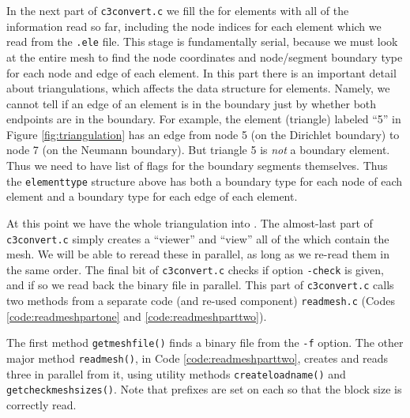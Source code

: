 
In the next part of \texttt{c3convert.c} we fill the \pVec for elements with all of the information read so far, including the node indices for each element which we read from the \texttt{.ele} file.  This stage is fundamentally serial, because we must look at the entire mesh to find the node coordinates and node/segment boundary type for each node and edge of each element.  In this part there is an important detail about triangulations, which affects the data structure for elements.  Namely, we cannot tell if an edge of an element is in the boundary just by whether both endpoints are in the boundary.  For example, the element (triangle) labeled ``5'' in Figure \ref{fig:triangulation} has an edge from node 5 (on the Dirichlet boundary) to node 7 (on the Neumann boundary).  But triangle 5 is \emph{not} a boundary element.  Thus we need to have list of flags for the boundary segments themselves.  Thus the \texttt{elementtype} structure above has both a boundary type for each node of each element and a boundary type for each edge of each element.

At this point we have the whole triangulation into \PETSc \pVecs.  The almost-last part of \texttt{c3convert.c} simply creates a \PETSc ``viewer'' and ``view'' all of the \pVecs which contain the mesh.  We will be able to reread these \pVecs in parallel, as long as we re-read them in the same order.  The final bit of \texttt{c3convert.c} checks if option \texttt{-check} is given, and if so we read back the binary file in parallel.  This part of \texttt{c3convert.c} calls two methods from a separate code (and re-used component) \texttt{readmesh.c} (Codes \ref{code:readmeshpartone} and \ref{code:readmeshparttwo}).

The first method \texttt{getmeshfile()} finds a \PETSc binary file from the \texttt{-f} option.  The other major method \texttt{readmesh()}, in Code \ref{code:readmeshparttwo}, creates and reads three \pVecs in parallel from it, using utility methods \texttt{createloadname()} and \texttt{getcheckmeshsizes()}.  Note that prefixes are set on each \pVec so that the block size is correctly read.




